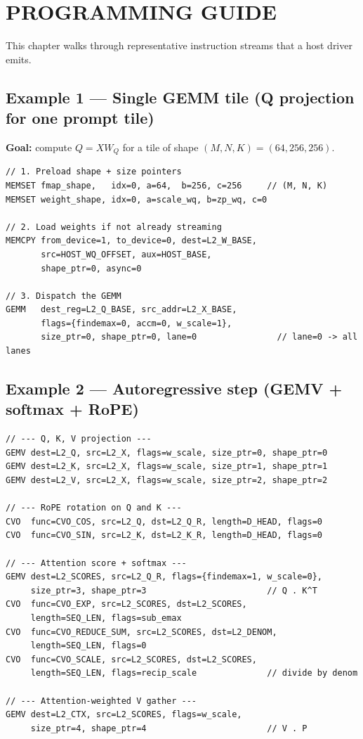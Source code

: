 \documentclass[11pt,a4paper,twoside,openany]{report}
\begin{document}
\chapter{PROGRAMMING GUIDE}

This chapter walks through representative instruction streams that a
host driver emits.

\section{Example 1 --- Single GEMM tile (Q projection for one prompt tile)}

\textbf{Goal:} compute $Q = X W_Q$ for a tile of shape
$(M, N, K) = (64, 256, 256)$.

\begin{lstlisting}[style=sv]
// 1. Preload shape + size pointers
MEMSET fmap_shape,   idx=0, a=64,  b=256, c=256     // (M, N, K)
MEMSET weight_shape, idx=0, a=scale_wq, b=zp_wq, c=0

// 2. Load weights if not already streaming
MEMCPY from_device=1, to_device=0, dest=L2_W_BASE,
       src=HOST_WQ_OFFSET, aux=HOST_BASE,
       shape_ptr=0, async=0

// 3. Dispatch the GEMM
GEMM   dest_reg=L2_Q_BASE, src_addr=L2_X_BASE,
       flags={findemax=0, accm=0, w_scale=1},
       size_ptr=0, shape_ptr=0, lane=0                // lane=0 -> all lanes
\end{lstlisting}

\section{Example 2 --- Autoregressive step (GEMV + softmax + RoPE)}

\begin{lstlisting}[style=sv]
// --- Q, K, V projection ---
GEMV dest=L2_Q, src=L2_X, flags=w_scale, size_ptr=0, shape_ptr=0
GEMV dest=L2_K, src=L2_X, flags=w_scale, size_ptr=1, shape_ptr=1
GEMV dest=L2_V, src=L2_X, flags=w_scale, size_ptr=2, shape_ptr=2

// --- RoPE rotation on Q and K ---
CVO  func=CVO_COS, src=L2_Q, dst=L2_Q_R, length=D_HEAD, flags=0
CVO  func=CVO_SIN, src=L2_K, dst=L2_K_R, length=D_HEAD, flags=0

// --- Attention score + softmax ---
GEMV dest=L2_SCORES, src=L2_Q_R, flags={findemax=1, w_scale=0},
     size_ptr=3, shape_ptr=3                        // Q . K^T
CVO  func=CVO_EXP, src=L2_SCORES, dst=L2_SCORES,
     length=SEQ_LEN, flags=sub_emax
CVO  func=CVO_REDUCE_SUM, src=L2_SCORES, dst=L2_DENOM,
     length=SEQ_LEN, flags=0
CVO  func=CVO_SCALE, src=L2_SCORES, dst=L2_SCORES,
     length=SEQ_LEN, flags=recip_scale              // divide by denom

// --- Attention-weighted V gather ---
GEMV dest=L2_CTX, src=L2_SCORES, flags=w_scale,
     size_ptr=4, shape_ptr=4                        // V . P
\end{lstlisting}
\end{document}
